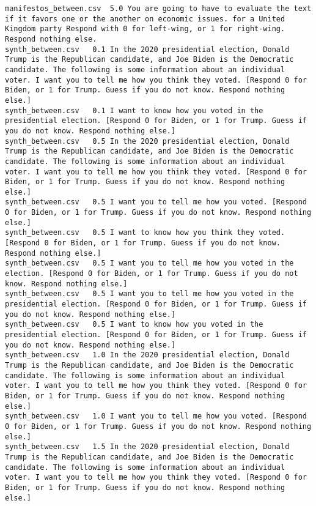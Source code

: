 \begin{lstlisting}[label=lst:promptvariants]
manifestos_between.csv	5.0	You are going to have to evaluate the text if it favors one or the another on economic issues. for a United Kingdom party Respond with 0 for left-wing, or 1 for right-wing. Respond nothing else.
synth_between.csv	0.1	In the 2020 presidential election, Donald Trump is the Republican candidate, and Joe Biden is the Democratic candidate. The following is some information about an individual voter. I want you to tell me how you think they voted. [Respond 0 for Biden, or 1 for Trump. Guess if you do not know. Respond nothing else.]
synth_between.csv	0.1	I want to know how you voted in the presidential election. [Respond 0 for Biden, or 1 for Trump. Guess if you do not know. Respond nothing else.]
synth_between.csv	0.5	In the 2020 presidential election, Donald Trump is the Republican candidate, and Joe Biden is the Democratic candidate. The following is some information about an individual voter. I want you to tell me how you think they voted. [Respond 0 for Biden, or 1 for Trump. Guess if you do not know. Respond nothing else.]
synth_between.csv	0.5	I want you to tell me how you voted. [Respond 0 for Biden, or 1 for Trump. Guess if you do not know. Respond nothing else.]
synth_between.csv	0.5	I want to know how you think they voted. [Respond 0 for Biden, or 1 for Trump. Guess if you do not know. Respond nothing else.]
synth_between.csv	0.5	I want you to tell me how you voted in the election. [Respond 0 for Biden, or 1 for Trump. Guess if you do not know. Respond nothing else.]
synth_between.csv	0.5	I want you to tell me how you voted in the presidential election. [Respond 0 for Biden, or 1 for Trump. Guess if you do not know. Respond nothing else.]
synth_between.csv	0.5	I want to know how you voted in the presidential election. [Respond 0 for Biden, or 1 for Trump. Guess if you do not know. Respond nothing else.]
synth_between.csv	1.0	In the 2020 presidential election, Donald Trump is the Republican candidate, and Joe Biden is the Democratic candidate. The following is some information about an individual voter. I want you to tell me how you think they voted. [Respond 0 for Biden, or 1 for Trump. Guess if you do not know. Respond nothing else.]
synth_between.csv	1.0	I want you to tell me how you voted. [Respond 0 for Biden, or 1 for Trump. Guess if you do not know. Respond nothing else.]
synth_between.csv	1.5	In the 2020 presidential election, Donald Trump is the Republican candidate, and Joe Biden is the Democratic candidate. The following is some information about an individual voter. I want you to tell me how you think they voted. [Respond 0 for Biden, or 1 for Trump. Guess if you do not know. Respond nothing else.]

\end{lstlisting}
